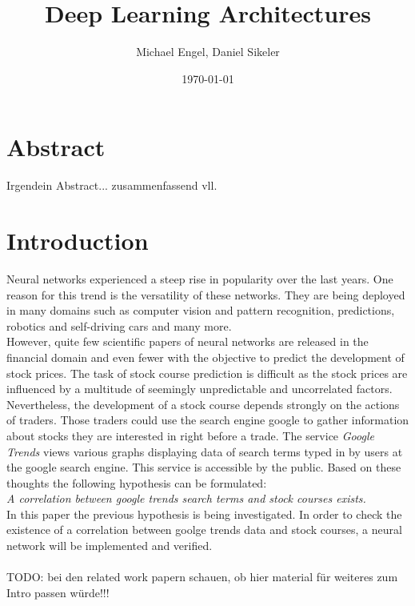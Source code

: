 \documentclass{IEEEtran}
\title{Deep Learning Architectures}
\author{Michael Engel, Daniel Sikeler}
\date{\today}
\begin{document}
\maketitle
\section{Abstract}
\label{sec:abstract}
Irgendein Abstract... zusammenfassend vll. 

\section{Introduction}
\label{sec:introduction}
Neural networks experienced a steep rise in popularity over the last years. One reason for this trend is the versatility of these networks. They are being deployed in many domains such as computer vision and pattern recognition, predictions, robotics and self-driving cars and many more. 
\\
However, quite few scientific papers of neural networks are released in the financial domain and even fewer with the objective to predict the development of stock prices. 
The task of stock course prediction is difficult as the stock prices are influenced by a multitude of seemingly unpredictable and uncorrelated factors. Nevertheless, the development of a stock course depends strongly on the actions of traders. Those traders could use the search engine google to gather information about stocks they are interested in right before a trade. The service \textit{Google Trends} views various graphs displaying data of search terms typed in by users at the google search engine. This service is accessible by the public. Based on these thoughts the following hypothesis can be formulated: \\
\textit{A correlation between google trends search terms and stock courses exists. } \\
In this paper the previous hypothesis is being investigated. In order to check the existence of a correlation between goolge trends data and stock courses, a neural network will be implemented and verified. 
\\ \\
TODO: bei den related work papern schauen, ob hier material für weiteres zum Intro passen würde!!!
\\
\end{document}

